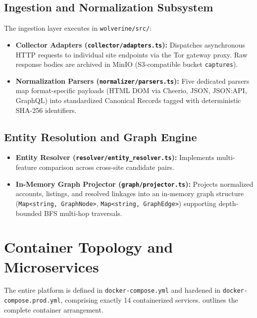 \subsection{Ingestion and Normalization Subsystem}
The ingestion layer executes in \texttt{wolverine/src/}:
\begin{itemize}
    \item \textbf{Collector Adapters (\texttt{collector/adapters.ts}):} Dispatches asynchronous HTTP requests to individual site endpoints via the Tor gateway proxy. Raw response bodies are archived in MinIO (S3-compatible bucket \texttt{captures}).
    \item \textbf{Normalization Parsers (\texttt{normalizer/parsers.ts}):} Five dedicated parsers map format-specific payloads (HTML DOM via Cheerio, JSON, JSON:API, GraphQL) into standardized Canonical Records tagged with deterministic SHA-256 identifiers.
\end{itemize}

\subsection{Entity Resolution and Graph Engine}
\begin{itemize}
    \item \textbf{Entity Resolver (\texttt{resolver/entity\_resolver.ts}):} Implements multi-feature comparison across cross-site candidate pairs.
    \item \textbf{In-Memory Graph Projector (\texttt{graph/projector.ts}):} Projects normalized accounts, listings, and resolved linkages into an in-memory graph structure (\texttt{Map<string, GraphNode>}, \texttt{Map<string, GraphEdge>}) supporting depth-bounded BFS multi-hop traversals.
\end{itemize}

\section{Container Topology and Microservices}
\label{sec:arch-containers}
The entire platform is defined in \texttt{docker-compose.yml} and hardened in \texttt{docker-compose.prod.yml}, comprising exactly 14 containerized services.  outlines the complete container arrangement.

